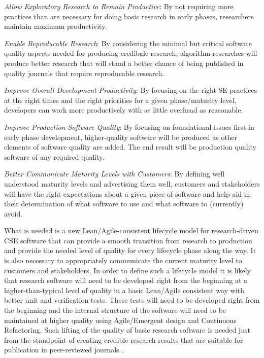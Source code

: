 \documentclass[11pt]{SANDreport}
\begin{document}
\begin{compactitem}

{}\item\textit{Allow Exploratory Research to Remain Productive}: By
not requiring more practices than are necessary for doing basic
research in early phases, researchers maintain maximum productivity.

{}\item\textit{Enable Reproducable Research}: By considering the
minimal but critical software quality aspects needed for producing
credibale research, algorithm researches will produce better research
that will stand a better chance of being published in quality journals
that require reproducable research.

{}\item\textit{Improve Overall Development Productivity}: By focusing
on the right SE practices at the right times and the right priorities
for a given phase/maturity level, developers can work more
productively with as little overhead as reasonable.

{}\item\textit{Improve Production Software Quality}: By focusing on
foundational issues first in early phase development, higher-quality
software will be produced as other elements of software quality are
added.  The end result will be production quality software of any
required quality.

{}\item\textit{Better Communicate Maturity Levels with Customers}: By
defining well understood maturity levels and advertising them well,
customers and stakeholders will have the right expectations about a
given piece of software and help aid in their determination of what
software to use and what software to (currently) avoid.

\end{compactitem}

What is needed is a new Lean/Agile-consistent lifecycle model for
research-driven CSE software that can provide a smooth transition from
research to production and provide the needed level of quality for
every lifecycle phase along the way.  It is also necessary to
appropriately communicate the current maturity level to customers and
stakeholders.  In order to define such a lifecycle model it is likely
that research software will need to be developed right from the
beginning at a higher-than-typical level of quality in a basic
Lean/Agile consistent way with better unit and verification tests.
These tests will need to be developed right from the beginning and the
internal structure of the software will need to be maintained at
higher quality using Agile/Emergent design and Continuous Refactoring.
Such lifting of the quality of basic research software is needed just
from the standpoint of creating credible research results that are
suitable for publication in peer-reviewed journals
{}\cite{CompSciDemandsNewParadigm05,
ScientistsNightmareFiveRetractions2006}.
\end{document}
